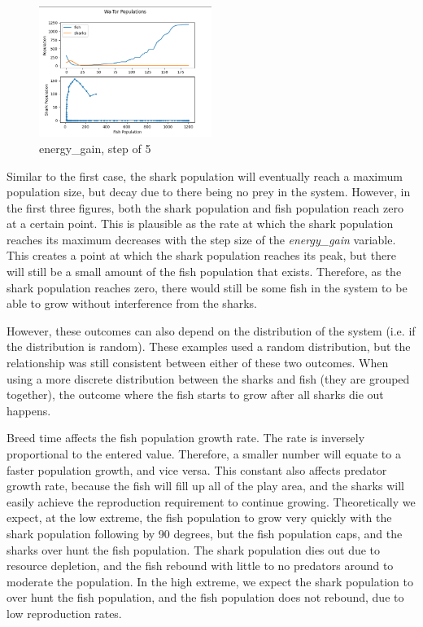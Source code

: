 \documentclass[12pt]{iopart} %
\begin{document}
\begin{figure}[h!tbp]
  \begin{center}
  \item[]\includegraphics[width=0.5\textwidth]{figure20.png}
  \caption{\label{fig:figure20}
  energy\_gain, step of 5
  }
  \end{center}
\end{figure}

Similar to the first case, the shark population will eventually reach a maximum population size, but decay due to there being no prey in the system. 
However, in the first three figures, both the shark population and fish population reach zero at a certain point. 
This is plausible as the rate at which the shark population reaches its maximum decreases with the step size of the \emph{energy\_gain} variable. 
This creates a point at which the shark population reaches its peak, but there will still be a small amount of the fish population that exists. 
Therefore, as the shark population reaches zero, there would still be some fish in the system to be able to grow without interference from the sharks.

However, these outcomes can also depend on the distribution of the system (i.e. if the distribution is random). 
These examples used a random distribution, but the relationship was still consistent between either of these two outcomes. 
When using a more discrete distribution between the sharks and fish (they are grouped together), the outcome where the fish starts to grow after all sharks die out happens.

Breed time affects the fish population growth rate. 
The rate is inversely proportional to the entered value. 
Therefore, a smaller number will equate to a faster population growth, and vice versa. 
This constant also affects predator growth rate, because the fish will fill up all of the play area, and the sharks will easily achieve the reproduction requirement to continue growing. 
Theoretically we expect, at the low extreme, the fish population to grow very quickly with the shark population following by 90 degrees, but the fish population caps, and the sharks over hunt the fish population. 
The shark population dies out due to resource depletion, and the fish rebound with little to no predators around to moderate the population. 
In the high extreme, we expect the shark population to over hunt the fish population, and the fish population does not rebound, due to low reproduction rates.
\end{document}
